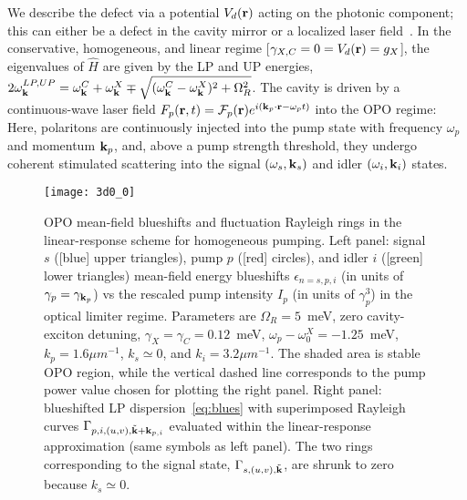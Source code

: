 %
We describe the defect via a potential $V_d (\mathbf{r})$ acting on the
photonic component; this can either be a defect in the cavity mirror
or a localized laser field~\cite{Amo_2009,Amo_2010,Zajac_2012}.
%
In the conservative, homogeneous, and linear regime [$\gamma_{X,C}=0=
V_d (\mathbf{r})= g_X$], the eigenvalues of $\hat{H}$ are given by the
LP and UP energies, $2
\omega_{\mathbf{k}}^{LP,UP} = \omega_{\mathbf{k}}^{C} +
\omega_{\mathbf{k}}^{X} \mp \sqrt{(\omega_{\mathbf{k}}^{C} -
  \omega_{\mathbf{k}}^{X})^2 + \Omega_R^2}$.
%
The cavity is driven by a continuous-wave laser field $F_p(\mathbf{r},t)
= \mathcal{F}_p(\mathbf{r}) e^{i (\mathbf{k}_p \cdot \mathbf{r} - \omega_p
  t)}$ into the OPO regime: Here, polaritons are continuously injected
into the pump state with frequency $\omega_p$ and momentum
$\mathbf{k}_p$, and, above a pump strength threshold, they undergo coherent
stimulated scattering into the signal $(\omega_s, \mathbf{k}_s)$ and
idler $(\omega_i, \mathbf{k}_i)$ states. 
%
\begin{figure}[tb]
\centering
\texttt{[image: 3d0\_0]} %
\caption{OPO mean-field blueshifts and fluctuation
  Rayleigh rings in the linear-response scheme for homogeneous
  pumping. Left panel: signal $s$ ([blue] upper triangles), pump $p$
  ([red] circles), and idler $i$ ([green] lower triangles) mean-field
  energy blueshifts $\epsilon_{n=s,p,i}$ (in units of $\gamma_p =
  \gamma_{\mathbf{k}_p}$) vs the rescaled pump intensity $I_p$ (in
  units of $\gamma_p^3$) in the optical limiter regime. Parameters are
  $\Omega_R=5$~meV, zero cavity-exciton detuning, $\gamma_X = \gamma_C
  = 0.12$~meV, $\omega_p - \omega_0^X = -1.25$~meV, $k_p=1.6{\mu
    m}^{-1}$, $k_s \simeq 0$, and $k_i=3.2{\mu m}^{-1}$.  The shaded
  area is stable OPO region, while the vertical dashed line
  corresponds to the pump power value chosen for plotting the right
  panel. Right panel: blueshifted LP dispersion~\eqref{eq:blues} with
  superimposed Rayleigh curves $\Gamma_{p,i,(u,v), \tilde{\mathbf{k}} +
    \mathbf{k}_{p, i}}$ evaluated within the linear-response
  approximation (same symbols as left panel). The two rings
  corresponding to the signal state, $\Gamma_{s,(u,v),
    \tilde{\mathbf{k}}}$, are shrunk to zero because $k_s \simeq 0$.}
\label{fig:spect}
\end{figure}
%


